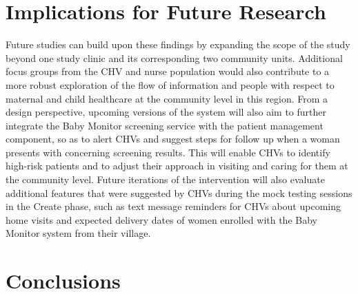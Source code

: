 \section{Implications for Future Research}
Future studies can build upon these findings by expanding the scope of the study beyond one study clinic and its corresponding two community units. Additional focus groups from the CHV and nurse population would also contribute to a more robust exploration of the flow of information and people with respect to maternal and child healthcare at the community level in this region. From a design perspective, upcoming versions of the system will also aim to further integrate the Baby Monitor screening service with the patient management component, so as to alert CHVs and suggest steps for follow up when a woman presents with concerning screening results. This will enable CHVs to identify high-risk patients and to adjust their approach in visiting and caring for them at the community level. Future iterations of the intervention will also evaluate additional features that were suggested by CHVs during the mock testing sessions in the Create phase, such as text message reminders for CHVs about upcoming home visits and expected delivery dates of women enrolled with the Baby Monitor system from their village. 


\section{Conclusions}
